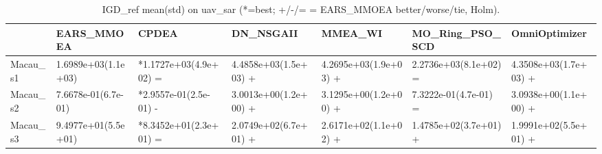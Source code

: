 \begin{table}[t]
\centering
\caption{IGD_ref mean(std) on uav_sar (*=best; +/-/= = EARS_MMOEA better/worse/tie, Holm).}
\label{tab:uav_sar_IGD_ref}
\begin{tabular}{lllllll}
\toprule
 & EARS\_MMOEA & CPDEA & DN\_NSGAII & MMEA\_WI & MO\_Ring\_PSO\_SCD & OmniOptimizer \\
\midrule
Macau\_s1 & 1.6989e+03(1.1e+03) & *1.1727e+03(4.9e+02) = & 4.4858e+03(1.5e+03) + & 4.2695e+03(1.9e+03) + & 2.2736e+03(8.1e+02) = & 4.3508e+03(1.7e+03) + \\
Macau\_s2 & 7.6678e-01(6.7e-01) & *2.9557e-01(2.5e-01) - & 3.0013e+00(1.2e+00) + & 3.1295e+00(1.2e+00) + & 7.3222e-01(4.7e-01) = & 3.0938e+00(1.1e+00) + \\
Macau\_s3 & 9.4977e+01(5.5e+01) & *8.3452e+01(2.3e+01) = & 2.0749e+02(6.7e+01) + & 2.6171e+02(1.1e+02) + & 1.4785e+02(3.7e+01) + & 1.9991e+02(5.5e+01) + \\
\bottomrule
\end{tabular}
\end{table}

